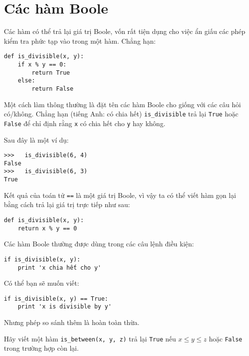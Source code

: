 \documentclass[11pt]{book}
\begin{document}
\section{Các hàm Boole}
\label{boolean}


Các hàm có thể trả lại giá trị Boole, vốn rất tiện dụng cho việc ẩn giấu
các phép kiểm tra phức tạp vào trong một hàm. Chẳng hạn:

\beforeverb
\begin{verbatim}
def is_divisible(x, y):
    if x % y == 0:
        return True
    else:
        return False
\end{verbatim}
\afterverb
%
Một cách làm thông thường là đặt tên các hàm Boole cho giống với các
câu hỏi có/không. Chẳng hạn (tiếng Anh: có chia hết)
\verb"is_divisible" trả lại {\tt True} hoặc {\tt False} để chỉ định rằng 
{\tt x} có chia hết cho {\tt y} hay không.

Sau đây là một ví dụ:

\beforeverb
\begin{verbatim}
>>>   is_divisible(6, 4)
False
>>>   is_divisible(6, 3)
True
\end{verbatim}
\afterverb
%
Kết quả của toán tử {\tt ==} là một giá trị Boole, vì vậy ta có thể viết hàm
gọn lại bằng cách trả lại giá trị trực tiếp như sau:

\beforeverb
\begin{verbatim}
def is_divisible(x, y):
    return x % y == 0
\end{verbatim}
\afterverb
%
Các hàm Boole thường được dùng trong các câu lệnh điều kiện:


\beforeverb
\begin{verbatim}
if is_divisible(x, y):
    print 'x chia hết cho y'
\end{verbatim}
\afterverb
%
Có thể bạn sẽ muốn viết:

\beforeverb
\begin{verbatim}
if is_divisible(x, y) == True:
    print 'x is divisible by y'
\end{verbatim}
\afterverb
%
Nhưng phép so sánh thêm là hoàn toàn thừa.

\begin{ex}
Hãy viết một hàm \verb"is_between(x, y, z)" trả lại 
{\tt True} nếu $x \le y \le z$ hoặc {\tt False} trong trường hợp còn lại.
\end{ex}
\end{document}
